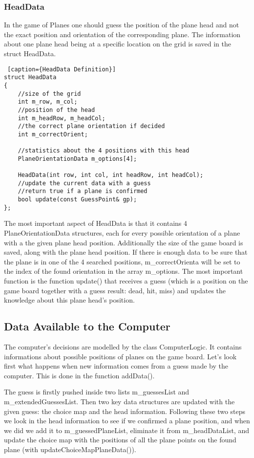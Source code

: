 \subsubsection{HeadData}

In the game of Planes one should guess the position of the plane head and not the exact position and orientation of the corresponding plane. The information about one plane head being at a specific location on the grid is saved in the struct HeadData.

\begin{lstlisting} [caption={HeadData Definition}]
struct HeadData
{
	//size of the grid
	int m_row, m_col;
	//position of the head
	int m_headRow, m_headCol;
	//the correct plane orientation if decided
	int m_correctOrient;
	
	//statistics about the 4 positions with this head
	PlaneOrientationData m_options[4];
	
	HeadData(int row, int col, int headRow, int headCol);
	//update the current data with a guess
	//return true if a plane is confirmed
	bool update(const GuessPoint& gp);
};
\end{lstlisting}

The most important aspect of HeadData is that it contains 4 PlaneOrientationData structures, each for every possible orientation of a plane with a the given plane head position. Additionally the size of the game board is saved, along with the plane head position. If there is enough data to be sure that the plane is in one of the 4 searched positions, m\_correctOrienta will be set to the index of the found orientation in the array m\_options. The most important function is the function update() that receives a guess (which is a position on the game board together with a guess result: dead, hit, miss) and updates the knowledge about this plane head's position.

\subsection{Data Available to the Computer}

The computer's decisions are modelled by the class ComputerLogic. It contains informations about possible positions of planes on the game board. Let's look first what happens when new information comes from a guess made by the computer. This is done in the function addData().

The guess is firstly pushed inside two lists m\_guessesList and m\_extendedGuessesList. Then two key data structures are updated with the given guess: the choice map and the head information. Following these two steps we look in the head information to see if we confirmed a plane position, and when we did we add it to m\_guessedPlaneList, eliminate it from m\_headDataList, and update the choice map with the positions of all the plane points on the found plane (with updateChoiceMapPlaneData()).

